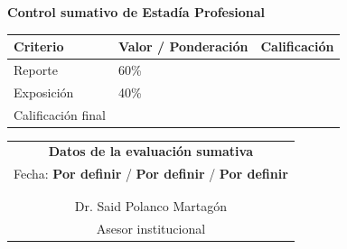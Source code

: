 \documentclass[12pt]{article}
\newcommand{\nasesorinstitucional}{Dr. Said Polanco Martagón}
\newcommand{\DiaEvaluacionPesentacion}{Por definir}
\newcommand{\MesEvaluacionPesentacion}{Por definir}
\newcommand{\AnhoEvaluacionPesentacion}{Por definir}
\begin{document}
\vspace*{3cm}

\begin{center}
{\large \textbf{Control sumativo de Estadía Profesional}}
\end{center}

\vspace{0.5cm}

\begin{center}
\begin{tabular}{|p{6cm}|p{4cm}|p{4cm}|}
\hline
\textbf{Criterio} & \textbf{Valor / Ponderación} & \textbf{Calificación} \\ \hline
Reporte & 60\% & \\ \hline
Exposición & 40\% & \\ \hline
Calificación final & \multicolumn{2}{c|}{ } \\ \hline
\end{tabular}
\end{center}

\vspace{0.8cm}


\begin{center}
\begin{tabular}{|p{10cm}|}
\hline
\multicolumn{1}{|c|}{\textbf{Datos de la evaluación sumativa}}\\
\multicolumn{1}{|c|}{Fecha: \textbf{\DiaEvaluacionPesentacion}  / \textbf{\MesEvaluacionPesentacion} / \textbf{\AnhoEvaluacionPesentacion}} \\ \hline
 \\
 \\ \hline
\multicolumn{1}{c}{\nasesorinstitucional}   \\
\multicolumn{1}{c}{Asesor institucional}   \\
\end{tabular}
\end{center}










\end{document}
